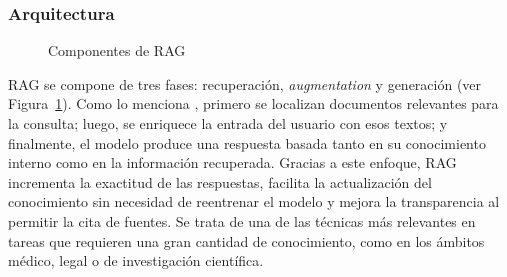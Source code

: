 \subsubsection{Arquitectura}
\begin{figure}[H]
\begin{center}
\end{center}
\caption{Componentes de RAG}
\label{fig:arquitectura_rag}
\end{figure}

RAG se compone de tres fases: recuperación, \textit{augmentation} y generación (ver Figura~\ref{fig:arquitectura_rag}). Como lo menciona \textcite{gao2023rag}, primero se 
localizan documentos relevantes para la consulta; luego, se enriquece la entrada del usuario con esos textos; y finalmente, el modelo produce 
una respuesta basada tanto en su conocimiento interno como en la información recuperada. Gracias a este enfoque, RAG incrementa la exactitud 
de las respuestas, facilita la actualización del conocimiento sin necesidad de reentrenar el modelo y mejora la transparencia al permitir la 
cita de fuentes. Se trata de una de las técnicas más relevantes en tareas que requieren una gran 
cantidad de conocimiento, como en los ámbitos médico, legal o de investigación científica.  

